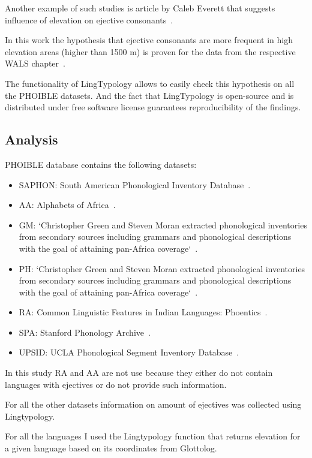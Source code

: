 \documentclass[a4paper,12pt]{article}
\begin{document}
Another example of such studies is article by Caleb Everett that suggests influence of elevation on ejective consonants~\parencite{ejectives}.

In this work the hypothesis that ejective consonants are more frequent in high elevation areas (higher than 1500 m) is proven for the data from the respective WALS chapter~\parencite{wals7}.

The functionality of LingTypology allows to easily check this hypothesis on all the PHOIBLE datasets. And the fact that LingTypology is open-source and is distributed under free software license guarantees reproducibility of the findings.

\subsection{Analysis}

PHOIBLE database contains the following datasets:
\begin{itemize}
 \item SAPHON: South American Phonological Inventory Database~\parencite{saphon}.
 \item AA: Alphabets of Africa~\parencite{aa}.
 \item GM: `Christopher Green and Steven Moran extracted phonological inventories from secondary sources including grammars and phonological descriptions with the goal of attaining pan-Africa coverage`~\parencite{gm}.
 \item PH: `Christopher Green and Steven Moran extracted phonological inventories from secondary sources including grammars and phonological descriptions with the goal of attaining pan-Africa coverage`~\parencite{gm}.
 \item RA: Common Linguistic Features in Indian Languages: Phoentics~\parencite{ra}.
 \item SPA: Stanford Phonology Archive~\parencite{spa}.
 \item UPSID: UCLA Phonological Segment Inventory Database~\parencite{upsid}.
\end{itemize}

In this study RA and AA are not use because they either do not contain languages with ejectives or do not provide such information.

For all the other datasets information on amount of ejectives was collected using Lingtypology.

For all the languages I used the Lingtypology function that returns elevation for a given language based on its coordinates from Glottolog.
\end{document}
